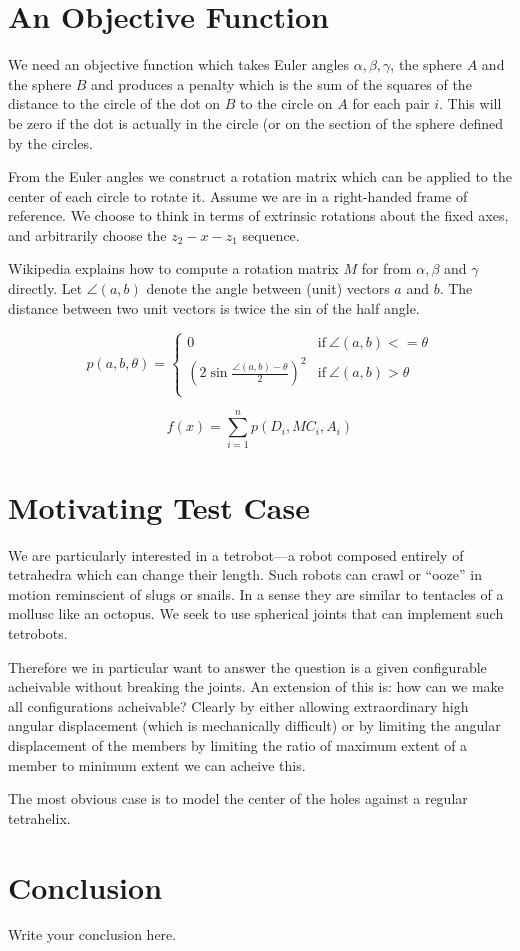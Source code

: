 \documentclass{article}
\begin{document}
  \section{An Objective Function}

  We need an objective function which takes Euler angles $\alpha,\beta,\gamma$,
  the sphere $A$ and the sphere $B$ and produces a penalty which is the sum of
  the squares of the distance to the circle of the dot on $B$ to the circle on $A$
  for each pair $i$. This will be zero if the dot is actually in the circle (or
  on the section of the sphere defined by the circles.

  From the Euler angles we construct a rotation matrix which can be applied to the
  center of each circle to rotate it. Assume we are in a right-handed frame of
  reference. We choose to think in terms of extrinsic rotations about the fixed
  axes, and arbitrarily choose the  $z_2-x-z_1$ sequence.

  Wikipedia explains how to compute a rotation matrix $M$ for from $\alpha, \beta$ and $\gamma$
  directly. Let $\angle (a,b)$ denote the angle between (unit) vectors $a$ and $b$.
  The distance between two unit vectors is twice the sin of the half angle.

  \[
p(a,b,\theta) =
\begin{cases}
  0 & \text{if}\ \angle(a,b) <= \theta \\
  (2\sin{\frac{\angle(a,b) - \theta}{2}})^2           & \text{if}\  \angle(a,b) > \theta \\
\end{cases}
  \]

\[
f(x) = \sum_{i=1}^{n} p(D_i,M C_i,A_i)
\]

\section{Motivating Test Case}

We are particularly interested in a tetrobot---a robot composed entirely of tetrahedra
which can change their length. Such robots
can crawl or ``ooze'' in motion reminscient of slugs or snails.
In a sense they are similar to tentacles of a mollusc like an octopus.
We seek to use spherical joints that can implement such tetrobots.

Therefore we in particular want to answer the question is a given configurable
acheivable without breaking the joints. An extension of this is: how can we make
all configurations acheivable? Clearly by either allowing extraordinary high angular
displacement (which is mechanically difficult) or by limiting the angular displacement
of the members by limiting the ratio of maximum extent of a member to minimum extent
we can acheive this.

The most obvious case is to model the center of the holes against a regular tetrahelix.







\section{Conclusion}
Write your conclusion here.
\end{document}
